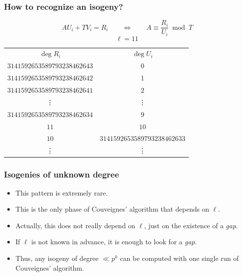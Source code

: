 \documentclass[10pt,usepdftitle=false]{beamer}
\begin{document}

\begin{frame}
  \frametitle{How to recognize an isogeny?}
  
  \[AU_i + TV_i = R_i  \qquad\Leftrightarrow\qquad  A\equiv \frac{R_i}{U_i} \bmod T\]
  \[\ell = 11\]
  \pause
  \begin{center}
  \begin{tabular}{c | c}
    $\deg R_i$ & $\deg U_i$ \\
    $3141592653589793238462643$ & 0 \\
    \pause
    $3141592653589793238462642$ & 1 \\
    \pause
    $3141592653589793238462641$ & $2$ \\
    \pause
    \vdots & \vdots\\
    $3141592653589793238462634$ & $9$ \\
    \pause\pause
    \Huge\alert{$11$} & \Huge\alert{$10$}\\
    \pause
    $10$ & $3141592653589793238462633$\\
    \vdots & \vdots
  \end{tabular}
  \end{center}
\end{frame}


\begin{frame}
  \frametitle{Isogenies of unknown degree}
  
  \begin{itemize}
  \item This pattern is extremely rare.
  \item This is the only phase of Couveignes' algorithm that depends on $\ell$.
  \end{itemize}

  \begin{itemize}
  \item<2-> \large Actually, this does not really depend on $\ell$,
    just on the existence of a \emph{gap}.
  \item<2-> \large If $\ell$ is not known in advance, it is enough to
    look for a \emph{gap}.
  \item<2-> \large Thus, any isogeny of degree $\ll p^k$ can be
    computed with one single run of Couveignes' algorithm.
  \end{itemize}  
\end{frame}

\end{document}
